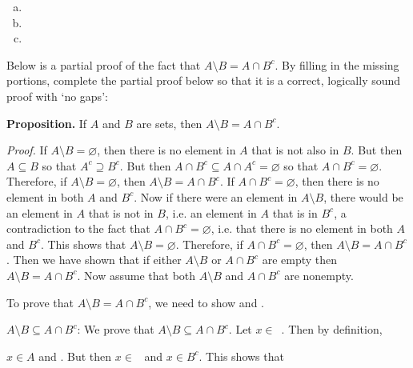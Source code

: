 \documentclass[11pt,letterpaper]{article}
\begin{document}
\sol
\begin{enumerate}[(a)]
\item 
\item 
\item 
\end{enumerate}



\newpage



 Below is a partial proof of the fact that $A \setminus B= A \cap B^c$. By filling in the missing portions, complete the partial proof below so that it is a correct, logically sound proof with `no gaps': \pspace

{\bfseries Proposition.} If $A$ and $B$ are sets, then $A \setminus B= A \cap B^c$. \pspace

{\itshape Proof.} If $A \setminus B= \varnothing$, then there is no element in $A$ that is not also in $B$. But then $A \subseteq B$ so that $A^c \supseteq B^c$. But then $A \cap B^c \subseteq A \cap A^c= \varnothing$ so that $A \cap B^c= \varnothing$. Therefore, if $A \setminus B= \varnothing$, then $A \setminus B= A \cap B^c$. If $A \cap B^c= \varnothing$, then there is no element in both $A$ and $B^c$. Now if there were an element in $A \setminus B$, there would be an element in $A$ that is not in $B$, i.e. an element in $A$ that is in $B^c$, a contradiction to the fact that $A \cap B^c= \varnothing$, i.e. that there is no element in both $A$ and $B^c$. This shows that $A \setminus B= \varnothing$. Therefore, if $A \cap B^c= \varnothing$, then $A \setminus B= A \cap B^c$. Then we have shown that if either $A \setminus B$ or $A \cap B^c$ are empty then $A \setminus B= A \cap B^c$. Now assume that both $A \setminus B$ and $A \cap B^c$ are nonempty. \pspace

To prove that $A \setminus B= A \cap B^c$, we need to show \underline{\hspace{3cm}} and \underline{\hspace{3cm}}. \par\vspace{3\baselineskip}

$A \setminus B \subseteq A \cap B^c$: We prove that $A \setminus B \subseteq A \cap B^c$. Let $x \in$~\underline{\hspace{3cm}}. Then by definition, \pspace

$x \in A$ and \underline{\hspace{3cm}}. But then $x \in$~\underline{\hspace{3cm}} and $x \in B^c$. This shows that \pspace
\end{document}

